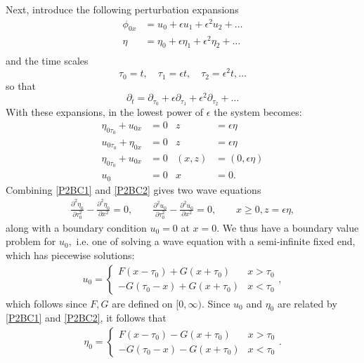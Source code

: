 \documentclass[10pt,reqno,oneside,a4paper]{article}
\begin{document}
Next, introduce the following perturbation expansions
\begin{align*}
\phi_{0x} &= u_0 + \epsilon u_1 +  \epsilon^2 u_2 + \ldots \\
\eta &= \eta_0 + \epsilon \eta_1 +  \epsilon^2 \eta_2 + \ldots \\
\end{align*}
and the time scales
\[ 
\tau_0 = t, \quad \tau_1 = \epsilon t, \quad \tau_2 = \epsilon^2 t, \ldots
\]
so that 
\[ 
\partial_t = \partial_{\tau_0} + \epsilon \partial_{\tau_1} + \epsilon^2 \partial_{\tau_2} + \ldots
\]
With these expansions, in the lowest power of $\epsilon$ the system becomes:
\begin{subequations} \label{NonDimHalfLineProb2}
\begin{align}
\label{P2BC1}\eta_{0\tau_0} + u_{0x} &=0 &z &= \epsilon\eta \\
\label{P2BC2} u_{0\tau_0} + \eta_{0x} &= 0 &z &= \epsilon\eta  \\
\label{P2BC3}\eta_{0\tau_0} +  u_{0x} &=0 &(x,z) &= (0,\epsilon\eta) \\
\label{P2BC4} u_0 &= 0 &x &= 0.
\end{align}
\end{subequations}
Combining \eqref{P2BC1} and \eqref{P2BC2} gives two wave equations
\begin{align*}
\frac{\partial^2 \eta_0}{\partial \tau_0^2} - \frac{\partial^2 \eta_0}{\partial x^2} = 0, \qquad \frac{\partial^2 u_0}{\partial \tau_0^2} - \frac{\partial^2 u_0}{\partial x^2} = 0, \qquad x\geq0, z= \epsilon \eta,
\end{align*}
along with a boundary condition $u_0 = 0$ at $x=0.$ We thus have a boundary value problem for $u_0,$ i.e. one of solving a wave equation with a semi-infinite fixed end, which has piecewise solutions:
\begin{align*}
u_0 = \begin{cases} F(x - \tau_0) + G(x+\tau_0) & x>\tau_0 \\ -G(\tau_0 - x) + G(x+\tau_0) & x< \tau_0 \end{cases},
\end{align*}
which follows since $F,G$ are defined on $[0, \infty).$ Since $u_0$ and $\eta_0$ are related by \eqref{P2BC1} and \eqref{P2BC2}, it follows that
\begin{align*}
\eta_0 = \begin{cases} F(x - \tau_0) - G(x+\tau_0) & x>\tau_0 \\ -G(\tau_0 - x) - G(x+\tau_0) & x< \tau_0 \end{cases}.
\end{align*}
\end{document}
